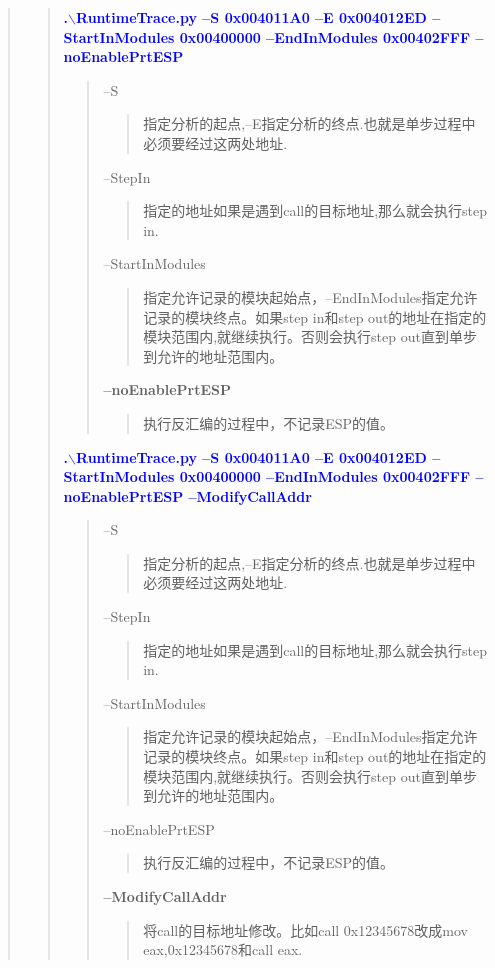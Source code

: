 \documentclass[AutoFakeBold,AutoFakeSlant]{article}
\begin{document}
\begin{flushleft}
\begin{quote}
\begin{quote}
		    \textcolor{blue}{ \textbf{ \Large
			.$\backslash$RuntimeTrace.py --S 0x004011A0 --E 0x004012ED --StartInModules 0x00400000 --EndInModules 0x00402FFF --noEnablePrtESP }} \\
			\begin{quote}
				--S \begin{quote}指定分析的起点,--E指定分析的终点.也就是单步过程中必须要经过这两处地址.\end{quote}
				--StepIn \begin{quote}指定的地址如果是遇到call的目标地址,那么就会执行step in.\end{quote}
				--StartInModules \begin{quote}指定允许记录的模块起始点，--EndInModules指定允许记录的模块终点。如果step in和step out的地址在指定的模块范围内,就继续执行。否则会执行step out直到单步到允许的地址范围内。\end{quote}
				\textbf{--noEnablePrtESP} \begin{quote}执行反汇编的过程中，不记录ESP的值。\end{quote}
			\end{quote}
			
			\bigskip			
			
			\textcolor{blue}{ \textbf{ \Large
			.$\backslash$RuntimeTrace.py --S 0x004011A0 --E 0x004012ED --StartInModules 0x00400000 --EndInModules 0x00402FFF --noEnablePrtESP --ModifyCallAddr }} \\
			\begin{quote}
				--S \begin{quote}指定分析的起点,--E指定分析的终点.也就是单步过程中必须要经过这两处地址.\end{quote}
				--StepIn \begin{quote}指定的地址如果是遇到call的目标地址,那么就会执行step in.\end{quote}
				--StartInModules \begin{quote}指定允许记录的模块起始点，--EndInModules指定允许记录的模块终点。如果step in和step out的地址在指定的模块范围内,就继续执行。否则会执行step out直到单步到允许的地址范围内。\end{quote}
				--noEnablePrtESP \begin{quote}执行反汇编的过程中，不记录ESP的值。\end{quote}
				\textbf{--ModifyCallAddr} \begin{quote}将call的目标地址修改。比如call 0x12345678改成mov eax,0x12345678和call eax. \end{quote}
			\end{quote}
			

\end{quote}
\end{quote}
\end{flushleft}
\end{document}
